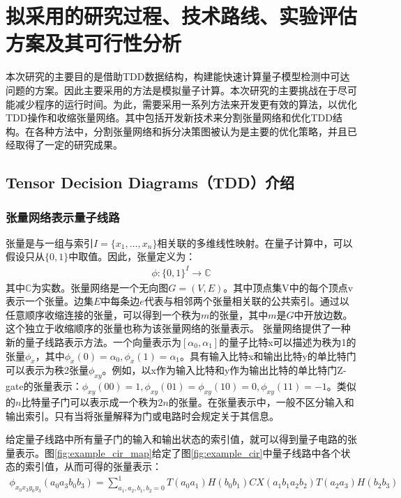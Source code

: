 \chapter{拟采用的研究过程、技术路线、实验评估方案及其可行性分析}
本次研究的主要目的是借助TDD数据结构，构建能快速计算量子模型检测中可达问题的方案。因此主要采用的方法是模拟量子计算。本次研究的主要挑战在于尽可能减少程序的运行时间。为此，需要采用一系列方法来开发更有效的算法，以优化TDD操作和收缩张量网络。其中包括开发新技术来分割张量网络和优化TDD结构。在各种方法中，分割张量网络和拆分决策图被认为是主要的优化策略，并且已经取得了一定的研究成果。
\section{Tensor Decision Diagrams（TDD）介绍}
\subsection{张量网络表示量子线路}
张量是与一组与索引\(I=\{x_1,\ldots,x_n\}\)相关联的多维线性映射。在量子计算中，可以假设只从\(\{0,1\}\)中取值。因此，张量定义为：
\begin{align}
    \phi :{\{0,1\}}^I\rightarrow\mathbb{C}
\end{align}
其中\(\mathbb{C}\)为实数。张量网络是一个无向图\(G=\left(V,E\right)\)。其中顶点集V中的每个顶点v表示一个张量。边集\(E\)中每条边\(e\)代表与相邻两个张量相关联的公共索引。通过以任意顺序收缩连接的张量，可以得到一个秩为\(m\)的张量，其中\(m\)是$G$中开放边数。这个独立于收缩顺序的张量也称为该张量网络的张量表示\citep{biamonte2019lectures}。
张量网络提供了一种新的量子线路表示方法\citep{pednault2017breaking}。一个向量表示为$[\alpha_0,\alpha_1]$的量子比特x可以描述为秩为1的张量$\phi_x$，其中$\phi_x\left(0\right)=\alpha_0, \phi_x\left(1\right)=\alpha_1$。具有输入比特x和输出比特y的单比特门可以表示为秩2张量$\phi_{xy}$。例如，以x作为输入比特和y作为输出比特的单比特门Z-gate的张量表示：$\phi_{xy}\left(00\right)=1,\phi_{xy}\left(01\right)=\phi_{xy}\left(10\right)=0,\phi_{xy}\left(11\right)=-1$。类似的$n$比特量子门可以表示成一个秩为$2n$的张量。在张量表示中，一般不区分输入和输出索引。只有当将张量解释为门或电路时会规定关于其信息。

给定量子线路中所有量子门的输入和输出状态的索引值，就可以得到量子电路的张量表示。图\ref{fig:example_cir_map}给定了图\ref{fig:example_cir}中量子线路中各个状态的索引值，从而可得的张量表示：
\begin{align}
\phi_{x_0x_3y_0y_3}\left(a_0a_3b_0b_3\right)=\sum_{a_1,a_2,b_1,b_2=0}^{1}T\left(a_0a_1\right)H\left(b_0b_1\right)CX\left(a_1b_1a_2b_2\right)T\left(a_2a_3\right)H\left(b_2b_3\right)
\end{align}

